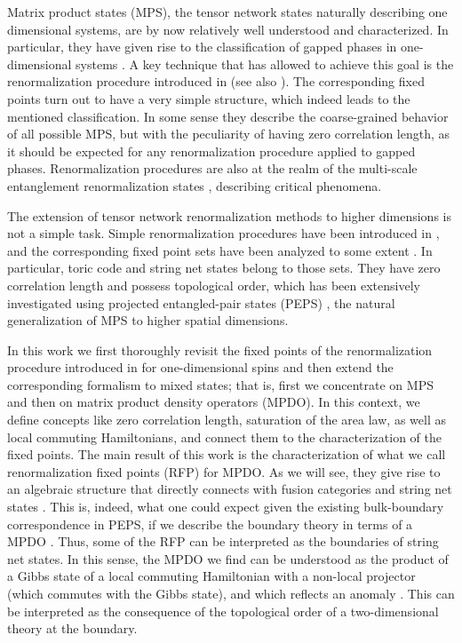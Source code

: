 \documentclass{elsarticle}
\begin{document}
Matrix product states (MPS), the tensor network states naturally describing one
dimensional systems, are by now relatively well understood and characterized.
In particular, they have given rise to the classification of gapped phases in
one-dimensional systems \cite{Wen,Norbertphases,Pollamann}. A key technique
that has allowed to achieve this goal is the renormalization procedure introduced
in \cite{Latorre} (see also \cite{Wen}). The corresponding fixed points turn out to have a very
simple structure, which indeed leads to the mentioned classification. In some sense
they describe the coarse-grained behavior of all possible MPS, but with the
peculiarity of having zero correlation length, as it should be expected for
any renormalization procedure applied to gapped phases. Renormalization
procedures are also at the realm of the multi-scale entanglement renormalization
states \cite{Mera}, describing critical phenomena.

The extension of tensor network renormalization methods to higher dimensions is
not a simple task. Simple renormalization procedures have been introduced in
\cite{WenRG2D,VidalRG2D}, and the corresponding fixed point sets have been analyzed to
some extent \cite{WenRGFP}. In particular, toric code \cite{Toric} and string net states
\cite{StringNet} belong to those sets. They have zero correlation length and
possess topological order, which has been extensively investigated using
projected entangled-pair states (PEPS) \cite{PEPS1,PEPS2}, the natural generalization of MPS to
higher spatial dimensions.

In this work we first thoroughly revisit the fixed points of the renormalization
procedure introduced in \cite{Latorre} for one-dimensional spins and then extend
the corresponding formalism to mixed states; that is, first we concentrate on MPS and
then on matrix product density operators (MPDO). In this context, we define concepts
like zero correlation length, saturation of the area law, as well as local
commuting Hamiltonians, and connect them to the characterization of the
fixed points. The main result of this work is the characterization of
what we call renormalization fixed points (RFP) for MPDO. As we will see, they
give rise to an algebraic structure that directly connects with fusion categories and
string net states \cite{StringNet,FrankStrings}. This is, indeed, what one
could expect given the existing bulk-boundary correspondence in PEPS, if we
describe the boundary theory in terms of a MPDO \cite{bulkboundary}. Thus, some of the
RFP can be interpreted as the boundaries of string net states. In this sense,
the MPDO we find can be understood \cite{bulkboundconj} as the product of a Gibbs state of a local
commuting Hamiltonian with a non-local projector (which commutes with the
Gibbs state), and which reflects an anomaly
\cite{anomaly}. This can be interpreted as the consequence of the topological order
of a two-dimensional theory at the boundary.
\end{document}
